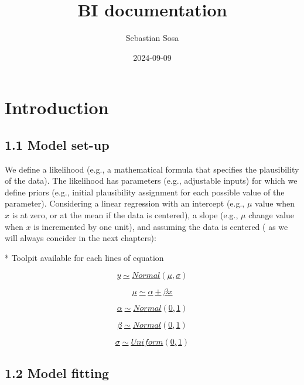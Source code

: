 \documentclass[
  letterpaper,
  DIV=11,
  numbers=noendperiod]{scrreprt}
\title{BI documentation}
\author{Sebastian Sosa}
\date{2024-09-09}
\renewcommand*\contentsname{Table of contents}
\newcommand\contentsname{Table of contents}
\begin{document}
\maketitle

\renewcommand*\contentsname{Table of contents}
{
\hypersetup{linkcolor=}
\setcounter{tocdepth}{2}
\tableofcontents
}


\chapter{}\label{section}


\chapter{Introduction}\label{introduction}

\section{1.1 Model set-up}\label{model-set-up}

We define a likelihood (e.g., a mathematical formula that specifies the
plausibility of the data). The likelihood has parameters (e.g.,
adjustable inputs) for which we define priors (e.g., initial
plausibility assignment for each possible value of the parameter).
Considering a linear regression with an intercept (e.g., \(μ\) value
when \(x\) is at zero, or at the mean if the data is centered), a slope
(e.g., \(μ\) change value when \(x\) is incremented by one unit), and
assuming the data is centered ({ as we will always concider in the next
chapters}):

{ * Toolpit available for each lines of equation }

\href{bi/doc/0.\%20\%Introduction.md}{\[y \sim  Normal(μ,σ)
\]}

\href{bi/doc/0.\%20\%Introduction.md}{\[ μ \sim α + βx
\]}

\href{bi/doc/0.\%20\%Introduction.md}{\[ α \sim Normal(0,1)
\]}

\href{bi/doc/0.\%20\%Introduction.md}{\[ β \sim Normal(0,1)
\]}

\href{bi/doc/0.\%20\%Introduction.md}{\[ σ \sim Uniform(0,1)
\]}

\section{1.2 Model fitting}\label{model-fitting}
\end{document}
